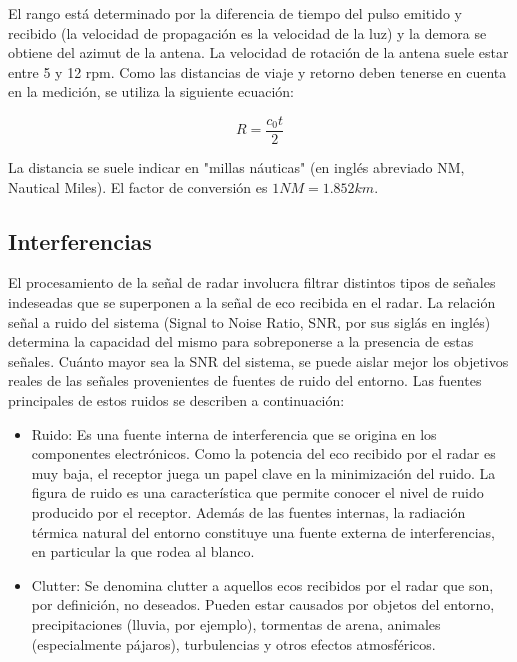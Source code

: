 El rango está determinado por la diferencia de tiempo del pulso emitido y recibido (la velocidad de propagación es la velocidad de la luz) y la demora se obtiene del azimut de la antena. La velocidad de rotación de la antena suele estar entre 5 y 12 rpm. Como las distancias de viaje y retorno deben tenerse en cuenta en la medición, se utiliza la siguiente ecuación:

\begin{equation}
R = \dfrac{c_{0} t}{2}
\end{equation}

La distancia se suele indicar en "millas náuticas" (en inglés abreviado NM, Nautical Miles). El factor de conversión es \(1 NM = 1.852 km\).



\subsection{Interferencias}
El procesamiento de la señal de radar involucra filtrar distintos tipos de señales indeseadas que se superponen a la señal de eco recibida en el radar. La relación señal a ruido del sistema (Signal to Noise Ratio, SNR, por sus siglás en inglés) determina la capacidad del mismo para sobreponerse a la presencia de estas señales. Cuánto mayor sea la SNR del sistema, se puede aislar mejor los objetivos reales de las señales provenientes de fuentes de ruido del entorno. Las fuentes principales de estos ruidos se describen a continuación:

\begin{itemize}

\item
Ruido:
Es una fuente interna de interferencia que se origina en los componentes electrónicos. Como la potencia del eco recibido por el radar es muy baja, el receptor juega un papel clave en la minimización del ruido. La figura de ruido es una característica que permite	conocer el nivel de ruido producido por el receptor. Además de las fuentes internas, la radiación térmica natural del entorno constituye una fuente externa de interferencias, en particular la que rodea al blanco.

\item
Clutter:
Se denomina clutter a aquellos ecos recibidos por el radar que son, por definición, no deseados. Pueden estar causados por objetos del entorno, precipitaciones (lluvia, por ejemplo), tormentas de arena, animales (especialmente pájaros), turbulencias y otros efectos atmosféricos. 
\end{itemize}
	

